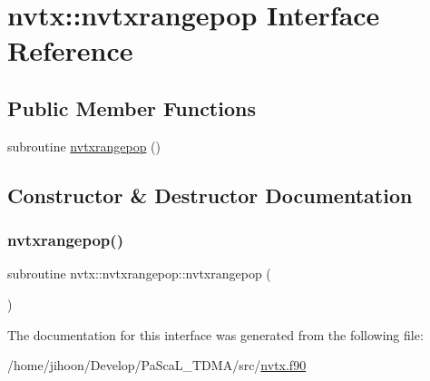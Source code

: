 \hypertarget{interfacenvtx_1_1nvtxrangepop}{}\section{nvtx\+:\+:nvtxrangepop Interface Reference}
\label{interfacenvtx_1_1nvtxrangepop}
\subsection*{Public Member Functions}
\begin{DoxyCompactItemize}
\item 
subroutine \hyperlink{interfacenvtx_1_1nvtxrangepop_ade36ac9b48a28449dab91510ce6e4a02}{nvtxrangepop} ()
\end{DoxyCompactItemize}


\subsection{Constructor \& Destructor Documentation}
\mbox{\label{interfacenvtx_1_1nvtxrangepop_ade36ac9b48a28449dab91510ce6e4a02}} 
\subsubsection{\texorpdfstring{nvtxrangepop()}{nvtxrangepop()}}
{\footnotesize\ttfamily subroutine nvtx\+::nvtxrangepop\+::nvtxrangepop (\begin{DoxyParamCaption}{ }\end{DoxyParamCaption})}



The documentation for this interface was generated from the following file\+:\begin{DoxyCompactItemize}
\item 
/home/jihoon/\+Develop/\+Pa\+Sca\+L\+\_\+\+T\+D\+M\+A/src/\hyperlink{nvtx_8f90}{nvtx.\+f90}\end{DoxyCompactItemize}
